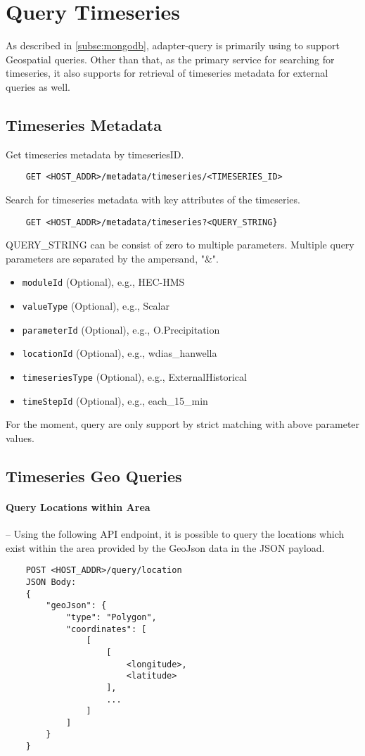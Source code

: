 \section{Query Timeseries}
\label{se:query}

As described in \cref{subse:mongodb}, adapter-query is primarily using to support Geospatial queries. Other than that, as the primary service for searching for timeseries, it also supports for retrieval of timeseries metadata for external queries as well.

\subsection{Timeseries Metadata}
Get timeseries metadata by timeseriesID.
\begin{lstlisting}
    GET <HOST_ADDR>/metadata/timeseries/<TIMESERIES_ID>
\end{lstlisting}

Search for timeseries metadata with key attributes of the timeseries.
\begin{lstlisting}
    GET <HOST_ADDR>/metadata/timeseries?<QUERY_STRING}
\end{lstlisting}

QUERY\_STRING can be consist of zero to multiple parameters. Multiple query parameters are separated by the ampersand, "\&".
\begin{itemize}
    \item \texttt{moduleId} (Optional), e.g., HEC-HMS
    \item \texttt{valueType} (Optional), e.g., Scalar
    \item \texttt{parameterId} (Optional), e.g., O.Precipitation
    \item \texttt{locationId} (Optional), e.g., wdias\_hanwella
    \item \texttt{timeseriesType} (Optional), e.g., ExternalHistorical
    \item \texttt{timeStepId} (Optional), e.g., each\_15\_min
\end{itemize}
For the moment, query are only support by strict matching with above parameter values.

\subsection{Timeseries Geo Queries}

\paragraph{Query Locations within Area}-- Using the following API endpoint, it is possible to query the locations which exist within the area provided by the GeoJson data in the JSON payload.
\begin{lstlisting}
    POST <HOST_ADDR>/query/location
    JSON Body:
    {
        "geoJson": {
            "type": "Polygon",
            "coordinates": [
                [
                    [
                        <longitude>,
                        <latitude>
                    ],
                    ...
                ]
            ]
        }
    }
\end{lstlisting}

